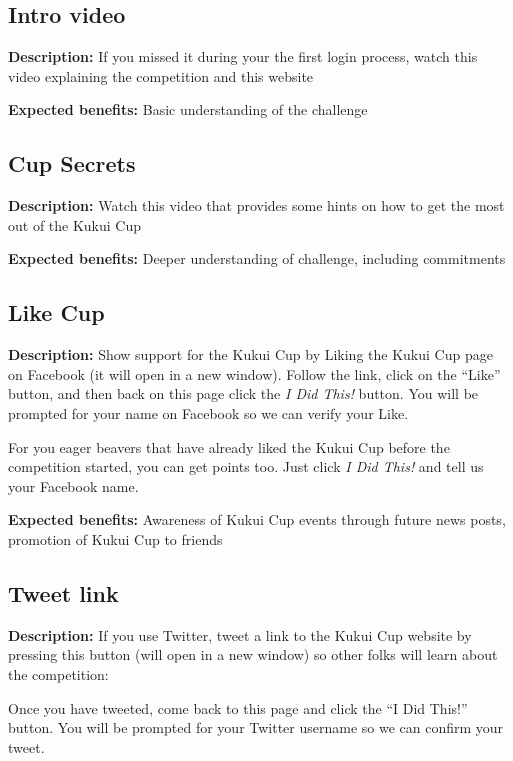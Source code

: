 \subsection{Intro video}

\textbf{Description:} If you missed it during your the first login process, watch this video explaining the competition and this website

\vspace{2ex}
\textbf{Expected benefits:} Basic understanding of the challenge


\subsection{Cup Secrets}

\textbf{Description:} Watch this video that provides some hints on how to get the most out of the Kukui Cup

\vspace{2ex}
\textbf{Expected benefits:} Deeper understanding of challenge, including commitments


\subsection{Like Cup}

\textbf{Description:} Show support for the Kukui Cup by Liking the Kukui Cup page on Facebook (it will open in a new window). Follow the link, click on the ``Like'' button, and then back on this page click the \emph{I Did This!} button. You will be prompted for your name on Facebook so we can verify your Like.

For you eager beavers that have already liked the Kukui Cup before the competition started, you can get points too. Just click \emph{I Did This!} and tell us your Facebook name.

\vspace{2ex}
\textbf{Expected benefits:} Awareness of Kukui Cup events through future news posts, promotion of Kukui Cup to friends


\subsection{Tweet link}

\textbf{Description:} If you use Twitter, tweet a link to the Kukui Cup website by pressing this button (will open in a new window) so other folks will learn about the competition:

Once you have tweeted, come back to this page and click the ``I Did This!'' button. You will be prompted for your Twitter username so we can confirm your tweet.

